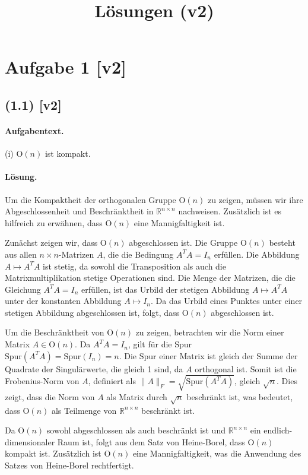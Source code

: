 \documentclass[11pt,a4paper]{article}
\title{Lösungen (v2)}
\date{}
\begin{document}
\maketitle

\section*{Aufgabe 1 [v2]}
\subsection*{(1.1) [v2]}
\paragraph{Aufgabentext.}
(i) $\mathrm{O}(n)$ ist kompakt.

\paragraph{Lösung.}
Um die Kompaktheit der orthogonalen Gruppe $\mathrm{O}(n)$ zu zeigen, müssen wir ihre Abgeschlossenheit und Beschränktheit in $\mathbb{R}^{n \times n}$ nachweisen. Zusätzlich ist es hilfreich zu erwähnen, dass $\mathrm{O}(n)$ eine Mannigfaltigkeit ist.

Zunächst zeigen wir, dass $\mathrm{O}(n)$ abgeschlossen ist. Die Gruppe $\mathrm{O}(n)$ besteht aus allen $n \times n$-Matrizen $A$, die die Bedingung $A^T A = I_n$ erfüllen. Die Abbildung $A \mapsto A^T A$ ist stetig, da sowohl die Transposition als auch die Matrixmultiplikation stetige Operationen sind. Die Menge der Matrizen, die die Gleichung $A^T A = I_n$ erfüllen, ist das Urbild der stetigen Abbildung $A \mapsto A^T A$ unter der konstanten Abbildung $A \mapsto I_n$. Da das Urbild eines Punktes unter einer stetigen Abbildung abgeschlossen ist, folgt, dass $\mathrm{O}(n)$ abgeschlossen ist.

Um die Beschränktheit von $\mathrm{O}(n)$ zu zeigen, betrachten wir die Norm einer Matrix $A \in \mathrm{O}(n)$. Da $A^T A = I_n$, gilt für die Spur $\text{Spur}(A^T A) = \text{Spur}(I_n) = n$. Die Spur einer Matrix ist gleich der Summe der Quadrate der Singulärwerte, die gleich 1 sind, da $A$ orthogonal ist. Somit ist die Frobenius-Norm von $A$, definiert als $\|A\|_F = \sqrt{\text{Spur}(A^T A)}$, gleich $\sqrt{n}$. Dies zeigt, dass die Norm von $A$ als Matrix durch $\sqrt{n}$ beschränkt ist, was bedeutet, dass $\mathrm{O}(n)$ als Teilmenge von $\mathbb{R}^{n \times n}$ beschränkt ist.

Da $\mathrm{O}(n)$ sowohl abgeschlossen als auch beschränkt ist und $\mathbb{R}^{n \times n}$ ein endlich-dimensionaler Raum ist, folgt aus dem Satz von Heine-Borel, dass $\mathrm{O}(n)$ kompakt ist. Zusätzlich ist $\mathrm{O}(n)$ eine Mannigfaltigkeit, was die Anwendung des Satzes von Heine-Borel rechtfertigt.
\end{document}
